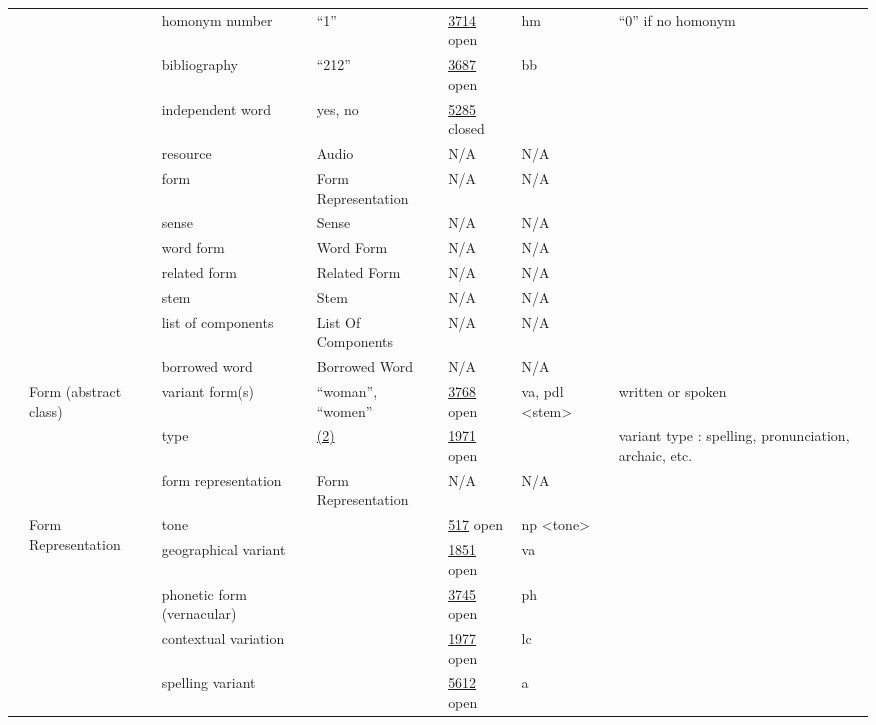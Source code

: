 \documentclass[a4paper,12pt]{article}
\begin{document}
\begin{center}
\begin{longtable}{*7{p{2cm}}}
& & homonym number & ``1'' & \href{http://www.isocat.org/datcat/DC-3714}{3714} open & hm & ``0'' if no homonym \\ \cmidrule{3-7}
& & bibliography & ``212'' & \href{http://www.isocat.org/datcat/DC-3687}{3687} open & bb & \\ \cmidrule{3-7}
& & independent word & yes, no & \href{http://www.isocat.org/datcat/DC-5285}{5285} closed & & \\ \cmidrule{3-7}
& & resource & Audio & N/A & N/A & \\ \cmidrule{3-7}
& & form & Form Re\-pre\-sen\-ta\-tion & N/A & N/A & \\ \cmidrule{3-7}
& & sense & Sense & N/A & N/A & \\ \cmidrule{3-7}
& & word form & Word Form & N/A & N/A & \\ \cmidrule{3-7}
& & related form & Related Form & N/A & N/A & \\ \cmidrule{3-7}
& & stem & Stem & N/A & N/A & \\ \cmidrule{3-7}
& & list of components & List Of Components & N/A & N/A & \\ \cmidrule{3-7}
& & borrowed word & Borrowed Word & N/A & N/A & \\ \cmidrule{2-7}
& \multirow{3}{2cm}{Form (abstract class)} & variant form(s) & ``woman'', ``women'' & \href{http://www.isocat.org/datcat/DC-3768}{3768} open & va, pdl \textless stem\textgreater & written or spoken \\ \cmidrule{3-7}
& & type & \hyperlink{2}{(2)} \hypertarget{type}{} & \href{http://www.isocat.org/datcat/DC-1971}{1971} open & & variant type : spelling, pronunciation, archaic, etc. \\ \cmidrule{3-7}
& & form representation & Form Re\-pre\-sen\-ta\-tion & N/A & N/A & \\ \cmidrule{2-7}
& \multirow{14}{2cm}{Form Re\-pre\-sen\-ta\-tion} & tone & & \href{http://www.isocat.org/datcat/DC-517}{517} open & np \textless tone\textgreater & \\ \cmidrule{3-7}
& & geographical variant & & \href{http://www.isocat.org/datcat/DC-1851}{1851} open & va & \\ \cmidrule{3-7}
& & phonetic form (vernacular) & & \href{http://www.isocat.org/datcat/DC-3745}{3745} open & ph & \\ \cmidrule{3-7}
& & contextual variation & & \href{http://www.isocat.org/datcat/DC-1977}{1977} open & lc & \\ \cmidrule{3-7}
& & spelling variant & & \href{http://www.isocat.org/datcat/DC-5612}{5612} open & a & \\ \cmidrule{3-7}

\end{longtable}
\end{center}
\end{document}
